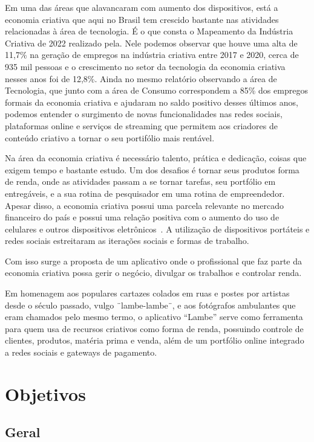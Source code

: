 Em uma das áreas que alavancaram com aumento dos dispositivos, está a economia criativa que aqui no Brasil tem crescido bastante nas atividades relacionadas à área de tecnologia.
É o que consta o Mapeamento da Indústria Criativa de 2022 realizado pela.
Nele podemos observar que houve uma alta de 11,7\% na geração de empregos na indústria criativa entre 2017 e 2020, cerca de 935 mil pessoas e o crescimento no setor da tecnologia da economia criativa nesses anos foi de 12,8\%.
Ainda no mesmo relatório observando a área de Tecnologia, que junto com a área de Consumo correspondem a 85\% dos empregos formais da economia criativa e ajudaram no saldo positivo desses últimos anos, podemos entender o surgimento de novas funcionalidades nas redes sociais, plataformas online e serviços de streaming que permitem aos criadores de conteúdo criativo a tornar o seu portifólio mais rentável.

Na área da economia criativa é necessário talento, prática e dedicação, coisas que exigem tempo e bastante estudo.
Um dos desafios é tornar seus produtos forma de renda, onde as atividades passam a se tornar tarefas, seu portfólio em entregáveis, e a sua rotina de pesquisador em uma rotina de empreendedor.
Apesar disso, a economia criativa possui uma parcela relevante no mercado financeiro do país e possui uma relação positiva com o aumento do uso de celulares e outros dispositivos eletrônicos~.
A utilização de dispositivos portáteis e redes sociais estreitaram as iterações sociais e formas de trabalho.

Com isso surge a proposta de um aplicativo onde o profissional que faz parte da economia criativa possa gerir o negócio, divulgar os trabalhos e controlar renda.

Em homenagem aos populares cartazes colados em ruas e postes por artistas desde o século passado, vulgo ¨lambe-lambe¨, e aos fotógrafos ambulantes que eram chamados pelo mesmo termo, o aplicativo “Lambe” serve como ferramenta para quem usa de recursos criativos como forma de renda, possuindo controle de clientes, produtos, matéria prima e venda, além de um portfólio online integrado a redes sociais e gateways de pagamento.

\section{Objetivos}\label{sec:objetivos}

\subsection{Geral}\label{subsec:geral}

